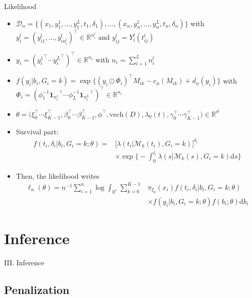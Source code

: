 \documentclass{beamer}
\newcommand{\dd}{\mathrm{d}}
\newcommand{\R}{\mathbb R}
\newcommand{\cM}{\mathcal M}
\newcommand{\cD}{\mathcal D}
\begin{document}
\begin{frame}{Likelihood}

\footnotesize
\begin{itemize}
  \item<1-> $\cD_n = \big\{ (x_1, y_1^1, \ldots, y_1^L, t_1, \delta_1), \ldots, (x_n, y_n^1, \ldots, y_n^L, t_n, \delta_n) \big\}$ with $y_i^l=(y_{i1}^l, \ldots, y_{in_i^l}^l)^\top \in \R^{n_i^l} \text{ and } y_{ij}^l=Y_i^l(t_{ij}^l)$
  \item<2-> $y_i = ({y_i^1}^\top \cdots {y_i^L}^\top)^\top \in \R^{n_i}$ with $n_i = \sum_{l=1}^L n_i^l$
  \item<3-> $f(y_i|b_i, G_i=k) = \exp \big\{(y_i \odot \Phi_i)^\top M_{ik} - c_\phi(M_{ik}) + d_\phi(y_i) \big\}$ with $\Phi_i = (\phi_1^{-1} {\textbf{1}_{n_i^1}}^\top \cdots \phi_L^{-1} {\textbf{1}_{n_i^L}}^\top)^\top \in \R^{n_i}$
  \item<4-> \scriptsize $\theta = \big(\xi_0^\top \cdots \xi_{K-1}^\top, \beta_0^\top \cdots \beta_{K-1}^\top, \phi^\top, \text{vech}(D), \lambda_0(t), \gamma_0^\top \cdots \gamma_{K-1}^\top\big) \in \R^\vartheta$ 
  \item<5-> Survival part: 
  \begin{align*}f(t_i, \delta_i| b_i, G_i = k ; \theta) = &\big[\lambda(t_i|\cM_k(t_i), G_i = k)\big]^{\delta_i} \\ & \times \exp \Big\{-\int_0^{t_i} \lambda(s|\cM_k(s), G_i = k) \dd s \Big\}
  \end{align*}
  \item<6-> Then, the likelihood writes
  \begin{align*}\ell_n(\theta) = n^{-1} \sum_{i=1}^n \log \int_{\R^r} \sum_{k=0}^{K-1} &\pi_{\xi_k}(x_i) f(t_i, \delta_i| b_i, G_i = k ; \theta) \\ & \times f(y_i | b_i, G_i = k ; \theta) f(b_i ; \theta) \dd b_i
  \end{align*}
\end{itemize}

\end{frame}

\section{Inference}

\begin{frame}[noframenumbering]
\Large \centering
\textcolor{blue_pres}{III.} Inference
\end{frame}

\subsection{Penalization}
\end{document}
